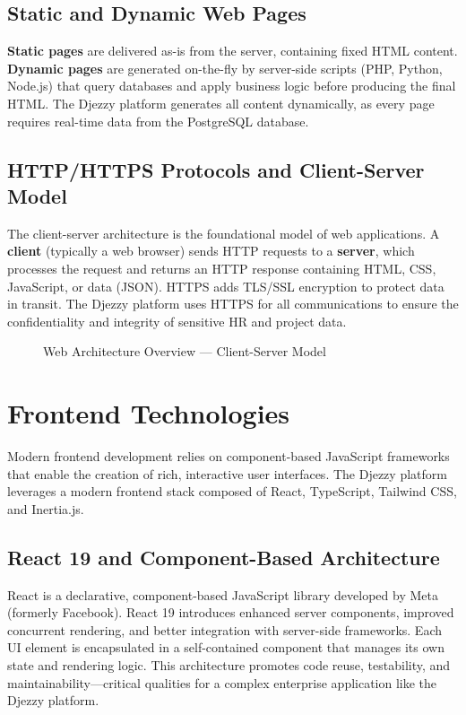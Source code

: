 \documentclass{bts-report}
\begin{document}
\subsection{Static and Dynamic Web Pages}
\textbf{Static pages} are delivered as-is from the server, containing fixed HTML content. \textbf{Dynamic pages} are generated on-the-fly by server-side scripts (PHP, Python, Node.js) that query databases and apply business logic before producing the final HTML. The Djezzy platform generates all content dynamically, as every page requires real-time data from the PostgreSQL database.

\subsection{HTTP/HTTPS Protocols and Client-Server Model}
The client-server architecture is the foundational model of web applications. A \textbf{client} (typically a web browser) sends HTTP requests to a \textbf{server}, which processes the request and returns an HTTP response containing HTML, CSS, JavaScript, or data (JSON). HTTPS adds TLS/SSL encryption to protect data in transit. The Djezzy platform uses HTTPS for all communications to ensure the confidentiality and integrity of sensitive HR and project data.

\begin{figure}[htbp]
  \centering
  \resizebox{0.9\textwidth}{!}{}
  \caption{Web Architecture Overview --- Client-Server Model}
  \label{fig:web-arch}
\end{figure}

\section{Frontend Technologies}

Modern frontend development relies on component-based JavaScript frameworks that enable the creation of rich, interactive user interfaces. The Djezzy platform leverages a modern frontend stack composed of React, TypeScript, Tailwind CSS, and Inertia.js.

\subsection{React 19 and Component-Based Architecture}
React is a declarative, component-based JavaScript library developed by Meta (formerly Facebook). React 19 introduces enhanced server components, improved concurrent rendering, and better integration with server-side frameworks. Each UI element is encapsulated in a self-contained component that manages its own state and rendering logic. This architecture promotes code reuse, testability, and maintainability---critical qualities for a complex enterprise application like the Djezzy platform.
\end{document}
